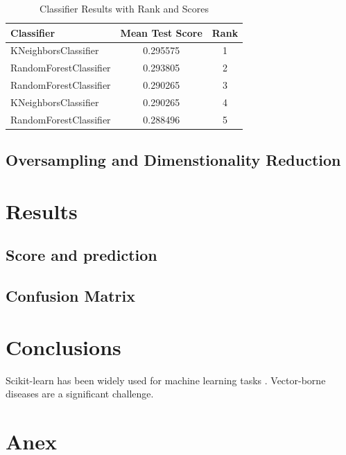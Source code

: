 \documentclass{article}
\begin{document}
\begin{table}[h!]
    \centering
    \caption{Classifier Results with Rank and Scores}
    \label{tab:classifier_ranks}
    \begin{tabular}{lcc}
    \toprule
    \textbf{Classifier}       & \textbf{Mean Test Score} & \textbf{Rank} \\
    \midrule
    KNeighborsClassifier      & 0.295575                & 1 \\
    RandomForestClassifier    & 0.293805                & 2 \\
    RandomForestClassifier    & 0.290265                & 3 \\
    KNeighborsClassifier      & 0.290265                & 4 \\
    RandomForestClassifier    & 0.288496                & 5 \\
    \bottomrule
    \end{tabular}
    \end{table}

\subsection{Oversampling and Dimenstionality Reduction}

\section{Results}

\subsection{Score and prediction}

\subsection{Confusion Matrix}

\section{Conclusions}
Scikit-learn has been widely used for machine learning tasks \cite{disease_dataset2023}. Vector-borne diseases are a significant challenge\cite{disease_dataset2023}.

\section{Anex}


\end{document}
